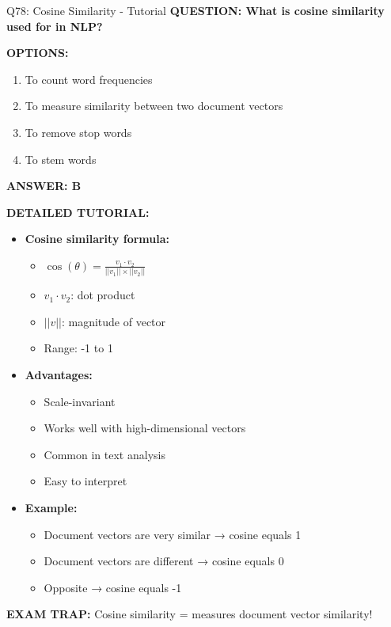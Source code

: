 \documentclass[8pt]{beamer}
\begin{document}
	\begin{frame}{Q78: Cosine Similarity - Tutorial}
		\fontsize{6.5}{7.5}\selectfont
		\textbf{QUESTION: What is cosine similarity used for in NLP?}
		
		\vspace{0.1cm}
		\textbf{OPTIONS:}
		\begin{enumerate}
			\item To count word frequencies
			\item To measure similarity between two document vectors
			\item To remove stop words
			\item To stem words
		\end{enumerate}
		
		\vspace{0.1cm}
		\textcolor{myblue}{\textbf{ANSWER: B}}
		
		\vspace{0.1cm}
		\textbf{DETAILED TUTORIAL:}
		\begin{itemize}
			\item \textbf{Cosine similarity formula:}
			\begin{itemize}
				\item $\cos(\theta) = \frac{v_1 \cdot v_2}{||v_1|| \times ||v_2||}$
				\item $v_1 \cdot v_2$: dot product
				\item $||v||$: magnitude of vector
				\item Range: -1 to 1
			\end{itemize}
			\item \textbf{Advantages:}
			\begin{itemize}
				\item Scale-invariant
				\item Works well with high-dimensional vectors
				\item Common in text analysis
				\item Easy to interpret
			\end{itemize}
			\item \textbf{Example:}
			\begin{itemize}
				\item Document vectors are very similar → cosine equals 1
				\item Document vectors are different → cosine equals 0
				\item Opposite → cosine equals -1
			\end{itemize}
		\end{itemize}
		
		\textcolor{myred}{\textbf{EXAM TRAP:}} Cosine similarity = \textcolor{myblue}{measures document vector similarity}!
	\end{frame}
	
\end{document}
